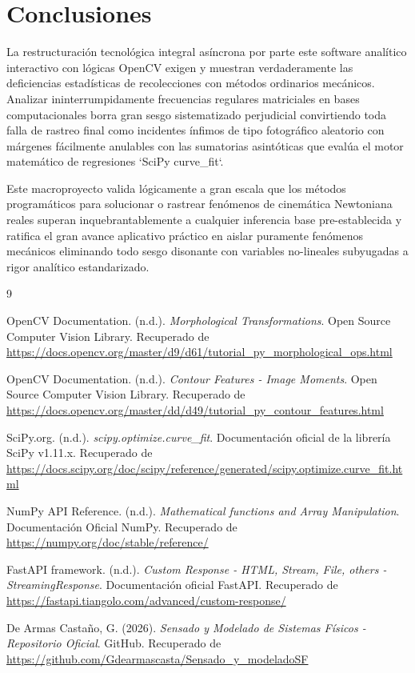 \documentclass[12pt,a4paper]{article}
\begin{document}
\section{Conclusiones}
La restructuración tecnológica integral asíncrona por parte este software analítico interactivo con lógicas OpenCV exigen y muestran verdaderamente las deficiencias estadísticas de recolecciones con métodos ordinarios mecánicos. Analizar ininterrumpidamente frecuencias regulares matriciales en bases computacionales borra gran sesgo sistematizado perjudicial convirtiendo toda falla de rastreo final como incidentes ínfimos de tipo fotográfico aleatorio con márgenes fácilmente anulables con las sumatorias asintóticas que evalúa el motor matemático de regresiones `SciPy curve\_fit`.

Este macroproyecto valida lógicamente a gran escala que los métodos programáticos para solucionar o rastrear fenómenos de cinemática Newtoniana reales superan inquebrantablemente a cualquier inferencia base pre-establecida y ratifica el gran avance aplicativo práctico en aislar puramente fenómenos mecánicos eliminando todo sesgo disonante con variables no-lineales subyugadas a rigor analítico estandarizado.

\newpage
\begin{thebibliography}{9}

OpenCV Documentation. (n.d.). 
\textit{Morphological Transformations}. Open Source Computer Vision Library. Recuperado de \url{https://docs.opencv.org/master/d9/d61/tutorial_py_morphological_ops.html}

OpenCV Documentation. (n.d.). 
\textit{Contour Features - Image Moments}. Open Source Computer Vision Library. Recuperado de \url{https://docs.opencv.org/master/dd/d49/tutorial_py_contour_features.html}

SciPy.org. (n.d.). 
\textit{scipy.optimize.curve\_fit}. Documentación oficial de la librería SciPy v1.11.x. Recuperado de \url{https://docs.scipy.org/doc/scipy/reference/generated/scipy.optimize.curve_fit.html}

NumPy API Reference. (n.d.). 
\textit{Mathematical functions and Array Manipulation}. Documentación Oficial NumPy. Recuperado de \url{https://numpy.org/doc/stable/reference/}

FastAPI framework. (n.d.). 
\textit{Custom Response - HTML, Stream, File, others - StreamingResponse}. Documentación oficial FastAPI. Recuperado de \url{https://fastapi.tiangolo.com/advanced/custom-response/}

De Armas Castaño, G. (2026). 
\textit{Sensado y Modelado de Sistemas Físicos - Repositorio Oficial}. GitHub. Recuperado de \url{https://github.com/Gdearmascasta/Sensado_y_modeladoSF}

\end{thebibliography}
\end{document}
